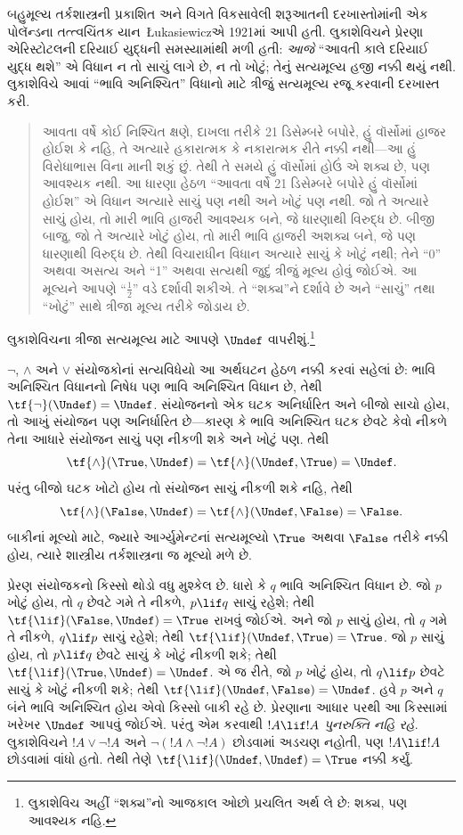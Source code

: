 બહુમૂલ્ય તર્કશાસ્ત્રની પ્રકાશિત અને વિગતે વિકસાવેલી શરૂઆતની
દરખાસ્તોમાંની એક પોલૅન્ડના તત્ત્વચિંતક યાન~\L ukasiewiczએ
1921માં આપી હતી. લુકાશેવિચને પ્રેરણા એરિસ્ટોટલની દરિયાઈ યુદ્ધની
સમસ્યામાંથી મળી હતી: \emph{આજે} ``આવતી કાલે દરિયાઈ યુદ્ધ થશે'' એ
વિધાન ન તો સાચું લાગે છે, ન તો ખોટું; તેનું સત્યમૂલ્ય હજી નક્કી થયું
નથી. લુકાશેવિચે આવાં ``ભાવિ અનિશ્ચિત'' વિધાનો માટે ત્રીજું સત્યમૂલ્ય
રજૂ કરવાની દરખાસ્ત કરી.
\begin{quote}
આવતા વર્ષે કોઈ નિશ્ચિત ક્ષણે, દાખલા તરીકે 21 ડિસેમ્બરે બપોરે,
હું વૉર્સોમાં હાજર હોઈશ કે નહિ, તે અત્યારે હકારાત્મક કે નકારાત્મક
રીતે નક્કી નથી—આ હું વિરોધાભાસ વિના માની શકું છું. તેથી તે
સમયે હું વૉર્સોમાં હોઉં એ શક્ય છે, પણ આવશ્યક નથી. આ ધારણા હેઠળ
``આવતા વર્ષે 21 ડિસેમ્બરે બપોરે હું વૉર્સોમાં હોઈશ'' એ વિધાન અત્યારે
સાચું પણ નથી અને ખોટું પણ નથી. જો તે અત્યારે સાચું હોય, તો મારી
ભાવિ હાજરી આવશ્યક બને, જે ધારણાથી વિરુદ્ધ છે. બીજી બાજુ, જો તે
અત્યારે ખોટું હોય, તો મારી ભાવિ હાજરી અશક્ય બને, જે પણ ધારણાથી
વિરુદ્ધ છે. તેથી વિચારાધીન વિધાન અત્યારે સાચું કે ખોટું નથી; તેને
``0'' અથવા અસત્ય અને ``1'' અથવા સત્યથી જુદું ત્રીજું મૂલ્ય હોવું
જોઈએ. આ મૂલ્યને આપણે ``$\frac{1}{2}$'' વડે દર્શાવી શકીએ. તે
``શક્ય''ને દર્શાવે છે અને ``સાચું'' તથા ``ખોટું'' સાથે ત્રીજા મૂલ્ય
તરીકે જોડાય છે.
\end{quote}
લુકાશેવિચના ત્રીજા સત્યમૂલ્ય માટે આપણે $\Undef$ વાપરીશું.\footnote{લુકાશેવિચ
અહીં ``શક્ય''નો આજકાલ ઓછો પ્રચલિત અર્થ લે છે: શક્ય, પણ આવશ્યક નહિ.}

$\lnot$, $\land$ અને $\lor$ સંયોજકોનાં સત્યવિધેયો આ અર્થઘટન હેઠળ
નક્કી કરવાં સહેલાં છે: ભાવિ અનિશ્ચિત વિધાનનો નિષેધ પણ ભાવિ અનિશ્ચિત
વિધાન છે, તેથી $\tf{\lnot}(\Undef) = \Undef$. સંયોજનનો એક ઘટક
અનિર્ધારિત અને બીજો સાચો હોય, તો આખું સંયોજન પણ અનિર્ધારિત છે—કારણ
કે ભાવિ અનિશ્ચિત ઘટક છેવટે કેવો નીકળે તેના આધારે સંયોજન સાચું પણ
નીકળી શકે અને ખોટું પણ. તેથી \[
    \tf{\land}(\True, \Undef) =
\tf{\land}(\Undef, \True) =
\Undef.
\]
પરંતુ બીજો ઘટક ખોટો હોય તો સંયોજન સાચું નીકળી શકે નહિ, તેથી
\[\tf{\land}(\False, \Undef) =
\tf{\land}(\Undef, \False) = \False.\]
બાકીનાં મૂલ્યો માટે, જ્યારે આર્ગ્યુમેન્ટનાં સત્યમૂલ્યો $\True$
અથવા $\False$ તરીકે નક્કી હોય, ત્યારે શાસ્ત્રીય તર્કશાસ્ત્રના
જ મૂલ્યો મળે છે.

પ્રેરણ સંયોજકનો કિસ્સો થોડો વધુ મુશ્કેલ છે. ધારો કે $q$ ભાવિ
અનિશ્ચિત વિધાન છે. જો $p$ ખોટું હોય, તો $q$ છેવટે ગમે તે નીકળે,
$p \lif q$ સાચું રહેશે; તેથી $\tf{\lif}(\False, \Undef) = \True$
રાખવું જોઈએ. અને જો $p$ સાચું હોય, તો $q$ ગમે તે નીકળે,
$q \lif p$ સાચું રહેશે; તેથી $\tf{\lif}(\Undef, \True) = \True$.
જો $p$ સાચું હોય, તો $p \lif q$ છેવટે સાચું કે ખોટું નીકળી શકે;
તેથી $\tf{\lif}(\True, \Undef) = \Undef$. એ જ રીતે, જો $p$
ખોટું હોય, તો $q \lif p$ છેવટે સાચું કે ખોટું નીકળી શકે; તેથી
$\tf{\lif}(\Undef, \False) = \Undef$. હવે $p$ અને $q$ બંને
ભાવિ અનિશ્ચિત હોય એવો કિસ્સો બાકી રહે છે. પ્રેરણાના આધાર પરથી
આ કિસ્સામાં ખરેખર $\Undef$ આપવું જોઈએ. પરંતુ એમ કરવાથી
$!A \lif !A$ \emph{પુનરુક્તિ નહિ રહે}. લુકાશેવિચને
$!A \lor \lnot !A$ અને $\lnot(!A \land \lnot !A)$ છોડવામાં
અડચણ નહોતી, પણ $!A \lif !A$ છોડવામાં વાંધો હતો. તેથી તેણે
$\tf{\lif}(\Undef, \Undef) = \True$ નક્કી કર્યું.

